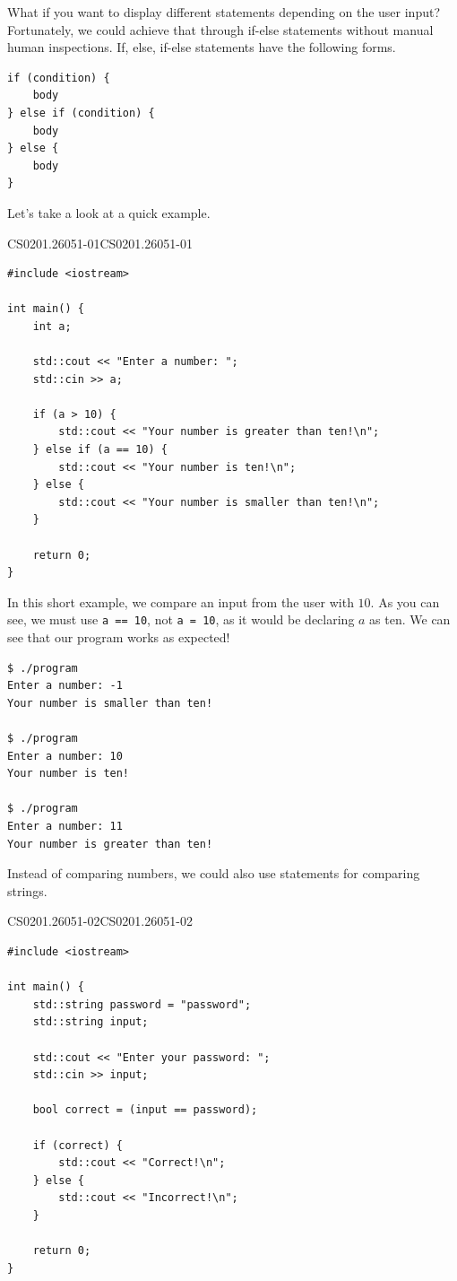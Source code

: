 \documentclass[../../../main.tex]{subfiles}
\begin{document}
What if you want to display different statements depending on
the user input? Fortunately, we could achieve that through
if-else statements without manual human inspections. If, else,
if-else statements have the following forms.

\begin{basicbox}
\begin{lstlisting}[style=basic]
if (condition) {
    body
} else if (condition) {
    body
} else {
    body
}
\end{lstlisting}
\end{basicbox}

Let's take a look at a quick example.

\begin{cppbox}{CS0201.26051-01}{CS0201.26051-01}
\begin{lstlisting}[style=cppstyle]
#include <iostream>

int main() {
    int a;

    std::cout << "Enter a number: ";
    std::cin >> a;

    if (a > 10) {
        std::cout << "Your number is greater than ten!\n";
    } else if (a == 10) {
        std::cout << "Your number is ten!\n";
    } else {
        std::cout << "Your number is smaller than ten!\n";
    }

    return 0;
}
\end{lstlisting}
\end{cppbox}

In this short example, we compare an input from the user with $10$.
As you can see, we must use \verb|a == 10|, not \verb|a = 10|, as
it would be declaring $a$ as ten. We can see that our program works
as expected!

\begin{outputbox}
\begin{lstlisting}[style=basic]
$ ./program
Enter a number: -1
Your number is smaller than ten!

$ ./program
Enter a number: 10
Your number is ten!

$ ./program
Enter a number: 11
Your number is greater than ten!
\end{lstlisting}
\end{outputbox}

Instead of comparing numbers, we could also use statements for
comparing strings.

\begin{cppbox}{CS0201.26051-02}{CS0201.26051-02}
\begin{lstlisting}[style=cppstyle]
#include <iostream>

int main() {
    std::string password = "password";
    std::string input;

    std::cout << "Enter your password: ";
    std::cin >> input;

    bool correct = (input == password);

    if (correct) {
        std::cout << "Correct!\n";
    } else {
        std::cout << "Incorrect!\n";
    }

    return 0;
}
\end{lstlisting}
\end{cppbox}
\end{document}
